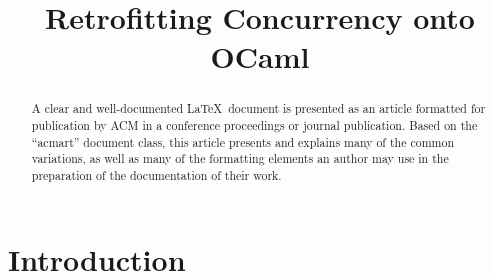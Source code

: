 \documentclass[sigplan,10pt,review,anonymous]{acmart}\settopmatter{printfolios=true,printccs=false,printacmref=false}
\begin{document}
\title{Retrofitting Concurrency onto OCaml}

\begin{abstract}
  A clear and well-documented \LaTeX\ document is presented as an
  article formatted for publication by ACM in a conference proceedings
  or journal publication. Based on the ``acmart'' document class, this
  article presents and explains many of the common variations, as well
  as many of the formatting elements an author may use in the
  preparation of the documentation of their work.
\end{abstract}

\maketitle

\section{Introduction}



\end{document}
